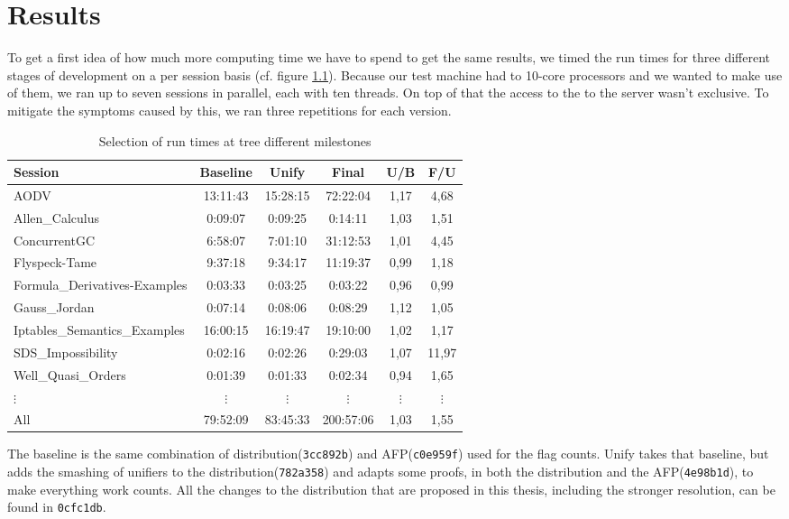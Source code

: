 \chapter{Results}\label{chapter:results}

To get a first idea of how much more computing time we have to spend to get the same results, we timed the run times for three different stages of development on a per session basis (cf. figure \ref{tab:runtimes}). Because our test machine had to 10-core processors and we wanted to make use of them, we ran up to seven sessions in parallel, each with ten threads. On top of that the access to the to the server wasn't exclusive. To mitigate the symptoms caused by this, we ran three repetitions for each version.

\begin{table}[ht]
\caption{Selection of run times at tree different milestones}
\begin{tabular}{l *{5}{c}}
Session & Baseline & Unify & Final & U/B & F/U\\ \hline
AODV & 13:11:43 & 15:28:15 & 72:22:04 & 1,17 & 4,68\\
Allen\_Calculus & 0:09:07 & 0:09:25 & 0:14:11 & 1,03 & 1,51\\
ConcurrentGC & 6:58:07 & 7:01:10 & 31:12:53 & 1,01 & 4,45\\
Flyspeck-Tame & 9:37:18 & 9:34:17 & 11:19:37 & 0,99 & 1,18\\
Formula\_Derivatives-Examples & 0:03:33 & 0:03:25 & 0:03:22 & 0,96 & 0,99\\
Gauss\_Jordan & 0:07:14 & 0:08:06 & 0:08:29 & 1,12 & 1,05\\
Iptables\_Semantics\_Examples & 16:00:15 & 16:19:47 & 19:10:00 & 1,02 & 1,17\\
SDS\_Impossibility & 0:02:16 & 0:02:26 & 0:29:03 & 1,07 & 11,97\\
Well\_Quasi\_Orders & 0:01:39 & 0:01:33 & 0:02:34 & 0,94 & 1,65\\
$\vdots$ & $\vdots$ & $\vdots$ & $\vdots$ & $\vdots$ & $\vdots$\\
\hline\hline
All & 79:52:09 & 83:45:33 & 200:57:06 & 1,03 & 1,55\\
\end{tabular}
\label{tab:runtimes}
\centering
\end{table}

The baseline is the same combination of distribution(\texttt{3cc892b}) and AFP(\texttt{c0e959f}) used for the flag counts. Unify takes that baseline, but adds the smashing of unifiers to the distribution(\texttt{782a358}) and adapts some proofs, in both the distribution and the AFP(\texttt{4e98b1d}), to make everything work counts. All the changes to the distribution that are proposed in this thesis, including the stronger resolution, can be found in \texttt{0cfc1db}.\\

